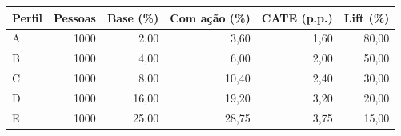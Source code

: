 \begin{tabular}{lrrrrr}
\toprule
Perfil & Pessoas & Base (\%) & Com ação (\%) & CATE (p.p.) & Lift (\%) \\
\midrule
A & 1000 & 2,00 & 3,60 & 1,60 & 80,00 \\
B & 1000 & 4,00 & 6,00 & 2,00 & 50,00 \\
C & 1000 & 8,00 & 10,40 & 2,40 & 30,00 \\
D & 1000 & 16,00 & 19,20 & 3,20 & 20,00 \\
E & 1000 & 25,00 & 28,75 & 3,75 & 15,00 \\
\bottomrule
\end{tabular}
